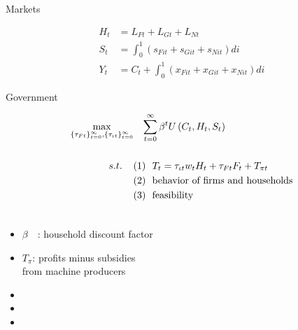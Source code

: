 \documentclass[11pt,aspectratio=169]{beamer}
\begin{document}
\begin{frame}{Markets}
\begin{minipage}[t!]{1\textwidth}
	\begin{align*}
		H_{t}&=L_{Ft}+L_{Gt}+L_{Nt}\\
		S_{t}& = \int_{0}^{1}\left(s_{Fit}+s_{Git}+s_{Nit}\right)di\\
		Y_t&=C_t+\int_{0}^{1}\left(x_{Fit}+x_{Git}+x_{Nit}\right)di
	\end{align*}
\end{minipage}
\end{frame}




\begin{frame}{ Government}
\hypertarget{gov}{}
\vspace{-4mm}
\centering
\begin{minipage}[t!]{1\textwidth}
	\begin{align*}
		\max_{\{\tau_{Ft}\}_{t=0}^{\infty}, \{\tau_{\iota t}\}_{t=0}^{\infty}}&\hspace{3mm} \sum_{t=0}^{\infty}\beta^t U\left(C_t,H_t, S_t\right)\\ \ \\
		{s.t.} \hspace{4mm}
		&{ (1)\ \ T_t=\tau_{\iota t}w_{t}H_{t}+{{\tau_{Ft}}}F_{t}}+T_{\pi t}\\
		& {(2)\ \  \text{behavior of firms and households}}\\
		& {(3)\ \ \text{feasibility} }\\
		& \ %
	\end{align*}
\end{minipage}

\small
\vspace{0mm}
\hspace{-10mm}
\begin{minipage}[t!]{0.5\textwidth}
	\vspace{7mm}
	\begin{itemize}
		\item[] $\beta$\ \ : household discount factor\vspace{-2mm}
		\item[] $T_\pi$: profits minus subsidies \\ \hspace{5.5mm} from machine producers \vspace{0mm}
	\end{itemize}
\end{minipage}
\begin{minipage}[t!]{0.4\textwidth}
	\vspace{8mm}
	\begin{itemize}
		\item[] %
		\vspace{-2mm}	
		\item[] %
		\item[] %
	\end{itemize}
\end{minipage}
\end{frame}
\end{document}
